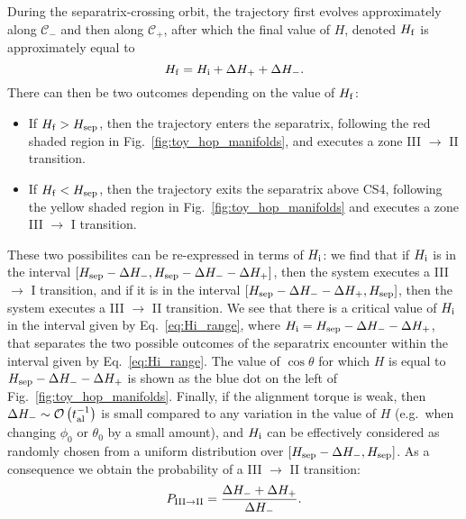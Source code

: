 \documentclass[
        fleqn,
        usenatbib,
    ]{mnras}
\newcommand*{\p}[1]{\left(#1\right)}
\newcommand*{\s}[1]{\left[#1\right]}
\begin{document}
During the separatrix-crossing orbit, the trajectory first evolves
approximately along $\mathcal{C}_-$ and then along $\mathcal{C}_+$, after which
the final value of $H$, denoted $H_{\rm f}$ is approximately equal to
\begin{equation}
    H_{\rm f} = H_{\rm i} + \Delta H_+ + \Delta H_-.
\end{equation}
There can then be two outcomes depending on the value of $H_{\rm f}$:
\begin{itemize}
    \item If $H_{\rm f} > H_{\rm sep}$, then the trajectory enters the
        separatrix, following the red shaded region in
        Fig.~\ref{fig:toy_hop_manifolds}, and executes a zone III $\to$ II
        transition.

    \item If $H_{\rm f} < H_{\rm sep}$, then the trajectory exits the separatrix
        above CS4, following the yellow shaded region in
        Fig.~\ref{fig:toy_hop_manifolds} and executes a zone III $\to$ I
        transition.
\end{itemize}
These two possibilites can be re-expressed in terms of $H_{\rm i}$: we find that
if $H_{\rm i}$ is in the interval $\s{H_{\rm sep} - \Delta H_-, H_{\rm sep} -
\Delta H_{-} - \Delta H_+}$, then the system executes a III $\to$ I transition,
and if it is in the interval $\s{H_{\rm sep} - \Delta H_- - \Delta H_+, H_{\rm
sep}}$, then the system executes a III $\to$ II transition. We see that there is
a critical value of $H_{\rm i}$ in the interval given by
Eq.~\eqref{eq:Hi_range}, where $H_{\rm i} = H_{\rm sep} - \Delta H_{-} - \Delta
H_+$, that separates the two possible outcomes of the separatrix encounter
within the interval given by Eq.~\eqref{eq:Hi_range}. The value of $\cos \theta$
for which $H$ is equal to $H_{\rm sep} - \Delta H_{-} - \Delta H_+$ is shown as
the blue dot on the left of Fig.~\ref{fig:toy_hop_manifolds}. Finally, if the
alignment torque is weak, then $\Delta H_- \sim \mathcal{O}\p{t_{\rm al}^{-1}}$
is small compared to any variation in the value of $H$ (e.g.\ when changing
$\phi_0$ or $\theta_0$ by a small amount), and $H_{\rm i}$ can be effectively
considered as randomly chosen from a uniform distribution over $\s{H_{\rm sep} -
\Delta H_-, H_{\rm sep}}$. As a consequence we obtain the probability of a III
$\to$ II transition:
\begin{equation}
    P_{\rm III \to II} = \frac{\Delta H_- + \Delta H_+}{\Delta H_-}.
        \label{eq:def_P32_toy}
\end{equation}
\end{document}
